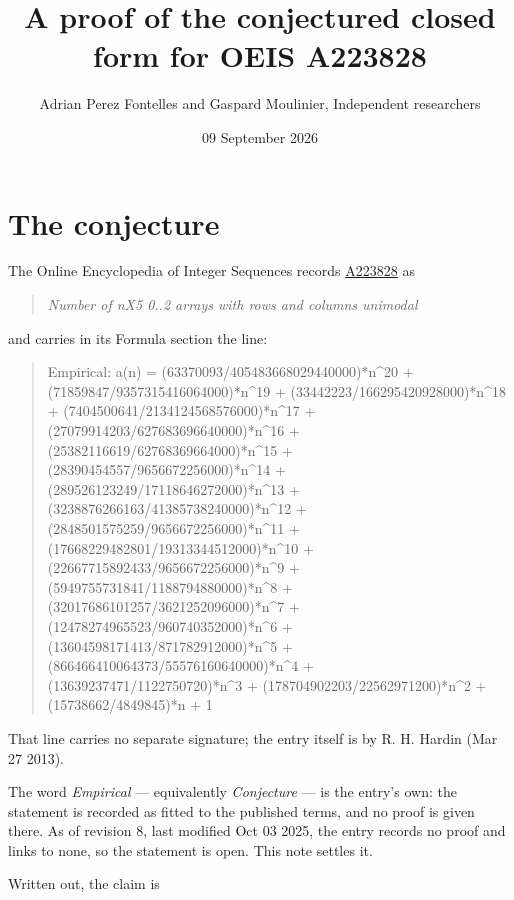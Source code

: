 \documentclass[11pt]{article}
\title{A proof of the conjectured closed form for OEIS A223828}
\author{Adrian Perez Fontelles and Gaspard Moulinier, Independent researchers}
\date{09 September 2026}
\theoremstyle{definition}
\begin{document}
\maketitle
\section{The conjecture}

The Online Encyclopedia of Integer Sequences records \href{https://oeis.org/A223828}{A223828} as

\begin{quote}\itshape Number of nX5 0..2 arrays with rows and columns unimodal\end{quote}

and carries in its Formula section the line:

\begin{quote}\ttfamily Empirical: a(n) = (63370093/405483668029440000)*n\textasciicircum{}20 + (71859847/9357315416064000)*n\textasciicircum{}19 + (33442223/166295420928000)*n\textasciicircum{}18 + (7404500641/2134124568576000)*n\textasciicircum{}17 + (27079914203/627683696640000)*n\textasciicircum{}16 + (25382116619/62768369664000)*n\textasciicircum{}15 + (28390454557/9656672256000)*n\textasciicircum{}14 + (289526123249/17118646272000)*n\textasciicircum{}13 + (3238876266163/41385738240000)*n\textasciicircum{}12 + (2848501575259/9656672256000)*n\textasciicircum{}11 + (17668229482801/19313344512000)*n\textasciicircum{}10 + (22667715892433/9656672256000)*n\textasciicircum{}9 + (5949755731841/1188794880000)*n\textasciicircum{}8 + (32017686101257/3621252096000)*n\textasciicircum{}7 + (12478274965523/960740352000)*n\textasciicircum{}6 + (13604598171413/871782912000)*n\textasciicircum{}5 + (866466410064373/55576160640000)*n\textasciicircum{}4 + (13639237471/1122750720)*n\textasciicircum{}3 + (178704902203/22562971200)*n\textasciicircum{}2 + (15738662/4849845)*n + 1\end{quote}

That line carries no separate signature; the entry itself is by R. H. Hardin (Mar 27 2013).

The word {\itshape Empirical} --- equivalently {\itshape Conjecture} --- is the entry's own: the statement is recorded as fitted to the published terms, and no proof is given there. As of revision 8, last modified Oct 03 2025, the entry records no proof and links to none, so the statement is open. This note settles it.

Written out, the claim is
\end{document}
